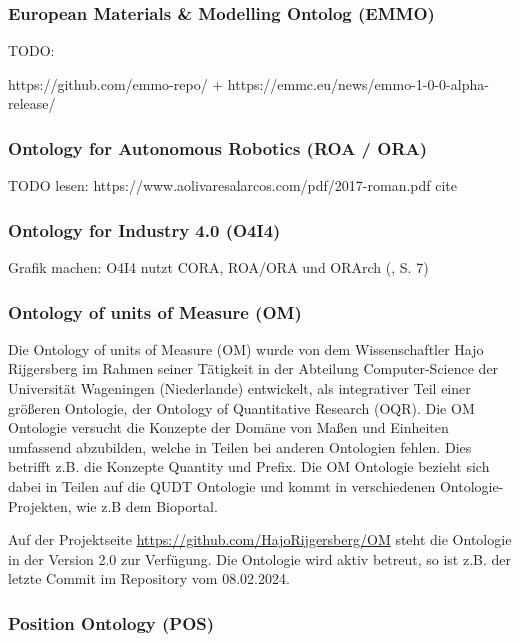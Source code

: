 \documentclass{article}
\begin{document}
\subsubsection{European Materials \& Modelling Ontolog (EMMO)}

TODO:

https://github.com/emmo-repo/ + https://emmc.eu/news/emmo-1-0-0-alpha-release/


\subsubsection{Ontology for Autonomous Robotics (ROA / ORA)}
TODO lesen: https://www.aolivaresalarcos.com/pdf/2017-roman.pdf
cite \cite{olszewska2017ontology}

\subsubsection{Ontology for Industry 4.0 (O4I4)}

\cite{kumar2019ontologies}

Grafik machen: O4I4 nutzt CORA, ROA/ORA und ORArch (\cite{kumar2019ontologies}, S. 7)

\subsubsection{Ontology of units of Measure (OM)}

Die Ontology of units of Measure (OM) wurde von dem Wissenschaftler Hajo Rijgersberg im Rahmen seiner Tätigkeit in der Abteilung Computer-Science der Universität Wageningen (Niederlande) entwickelt, als integrativer Teil einer größeren Ontologie\cite{rijgersberg2013ontology}, der Ontology of Quantitative Research (OQR).
Die OM Ontologie versucht die Konzepte der Domäne von Maßen und Einheiten umfassend abzubilden, welche in Teilen bei anderen Ontologien fehlen. Dies betrifft z.B. die Konzepte Quantity und Prefix. Die OM Ontologie bezieht sich dabei in Teilen auf die QUDT Ontologie und kommt in verschiedenen Ontologie-Projekten, wie z.B dem Bioportal\cite{OM_BioPortal}.

Auf der Projektseite \url{https://github.com/HajoRijgersberg/OM} steht die Ontologie in der Version 2.0 zur Verfügung. Die Ontologie wird aktiv betreut, so ist z.B. der letzte Commit im Repository vom 08.02.2024.

\subsubsection{Position Ontology (POS)}
\end{document}
